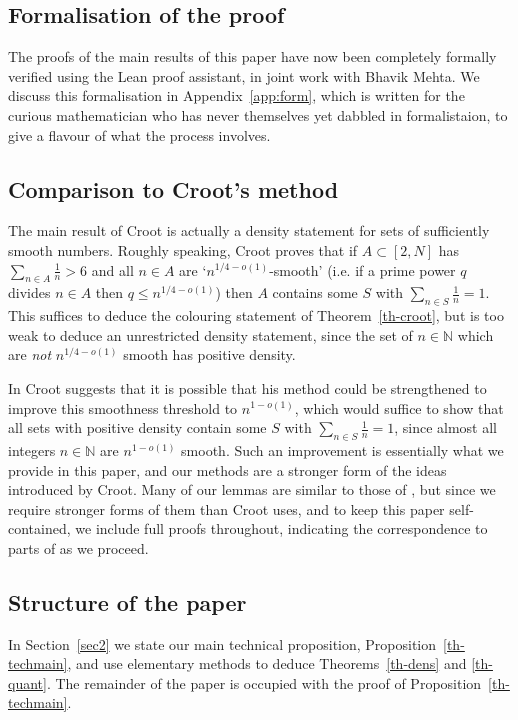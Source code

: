 \documentclass{amsart}
\newcommand{\bbn}{\mathbb{N}}
\begin{document}
 \subsection*{Formalisation of the proof} The proofs of the main results of this paper have now been completely formally verified using the Lean proof assistant, in joint work with Bhavik Mehta. We discuss this formalisation in Appendix~\ref{app:form}, which is written for the curious mathematician who has never themselves yet dabbled in formalistaion, to give a flavour of what the process involves.

 
 \subsection*{Comparison to Croot's method}
The main result of Croot \cite{Cr2003} is actually a density statement for sets of sufficiently smooth numbers. Roughly speaking, Croot proves that if $A\subset [2,N]$ has $\sum_{n\in A}\frac{1}{n}> 6$ and all $n\in A$ are `$n^{1/4-o(1)}$-smooth' (i.e. if a prime power $q$ divides $n\in A$ then $q\leq n^{1/4-o(1)}$) then $A$ contains some $S$ with $\sum_{n\in S}\frac{1}{n}=1$. This suffices to deduce the colouring statement of Theorem~\ref{th-croot}, but is too weak to deduce an unrestricted density statement, since the set of $n\in \bbn$ which are \emph{not} $n^{1/4-o(1)}$ smooth has positive density. 

In \cite{Crootphd} Croot suggests that it is possible that his method could be strengthened to improve this smoothness threshold to $n^{1-o(1)}$, which would suffice to show that all sets with positive density contain some $S$ with $\sum_{n\in S}\frac{1}{n}=1$, since almost all integers $n\in\bbn$ are $n^{1-o(1)}$ smooth. Such an improvement is essentially what we provide in this paper, and our methods are a stronger form of the ideas introduced by Croot. Many of our lemmas are similar to those of \cite{Cr2003}, but since we require stronger forms of them than Croot uses, and to keep this paper self-contained, we include full proofs throughout, indicating the correspondence to parts of \cite{Cr2003} as we proceed.

\subsection*{Structure of the paper}
In Section~\ref{sec2} we state our main technical proposition, Proposition~\ref{th-techmain}, and use elementary methods to deduce Theorems~\ref{th-dens} and \ref{th-quant}. The remainder of the paper is occupied with the proof of Proposition~\ref{th-techmain}.
\end{document}

